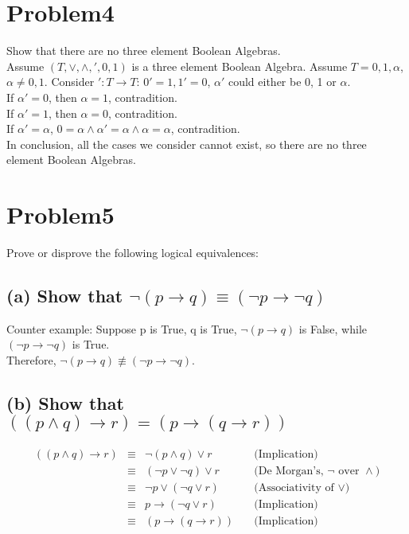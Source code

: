 \documentclass[]{article}
\begin{document}
\begin{spacing}{1.5}
	\section*{Problem4}
		Show that there are no three element Boolean Algebras.\\
		Assume $ (T, \vee, \wedge, ', 0,1)$  is a three element Boolean Algebra. Assume $ T = {0, 1, \alpha} $, $ \alpha \neq 0, 1$. Consider $ ': T \rightarrow T $: $ 0' = 1, 1' = 0 $, $ \alpha' $ could either be 0, 1 or $\alpha$.\\
		If $\alpha'=0$, then $\alpha=1$, contradition.\\
		If $\alpha'=1$, then $\alpha=0$, contradition.\\
		If $\alpha'=\alpha$, $ 0=\alpha \wedge \alpha' = \alpha \wedge \alpha = \alpha $, contradition.\\
		In conclusion, all the cases we consider cannot exist, so there are no three element Boolean Algebras.
		
		
		
	\section*{Problem5}
		Prove or disprove the following logical equivalences:
		\subsection*{(a)  Show that $ \neg (p \rightarrow q) \equiv (\neg p \rightarrow \neg q) $}
		Counter example: Suppose p is True, q is True, $  \neg (p \rightarrow q) $ is False, while $ (\neg p \rightarrow \neg q) $ is True.\\
		Therefore, $ \neg (p \rightarrow q) \not\equiv (\neg p \rightarrow \neg q) $.
		\subsection*{(b) Show that $ ((p\wedge q) \rightarrow  r) = (p \rightarrow  (q\rightarrow r)) $}
		\[\begin{array}{rclr}
			((p\wedge q) \rightarrow  r)&\equiv& \neg (p \wedge  q) \vee  r &\quad\text{(Implication)}\\
			&\equiv& (\neg p \vee  \neg q) \vee  r &\quad\text{(De Morgan's, $\neg$ over $\wedge$)}\\
			&\equiv& \neg p \vee  (\neg q \vee  r) &\quad\text{(Associativity of $\vee$)}\\
			&\equiv& p \rightarrow  (\neg q \vee  r) &\quad\text{(Implication)}\\
			&\equiv& (p \rightarrow  (q\rightarrow r)) &\quad\text{(Implication)}
		\end{array}\]
	

\end{spacing}
\end{document}

